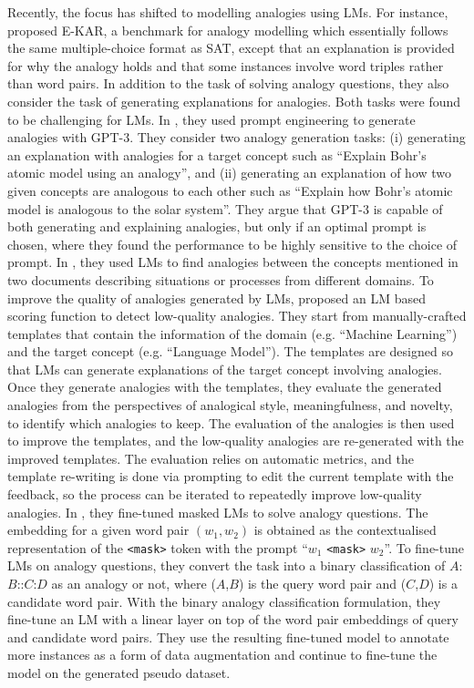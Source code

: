 \documentclass[3p]{elsarticle}
\begin{document}
{Recently, the focus has shifted to modelling analogies using LMs. For instance, \cite{chen-etal-2022-e} proposed E-KAR, a benchmark for analogy modelling which essentially follows the same multiple-choice format as SAT, except that an explanation is provided for why the analogy holds and that some instances involve word triples rather than word pairs. In addition to the task of solving analogy questions, they also consider the task of generating explanations for analogies. Both tasks were found to be challenging for LMs. 
In \cite{bhavya-etal-2022-analogy}, they used prompt engineering to generate analogies with GPT-3. They consider two analogy generation tasks: (i) generating an explanation with analogies for a target concept such as ``Explain Bohr's atomic model using an analogy'', and (ii) generating an explanation of how two given concepts are analogous to each other such as ``Explain how Bohr's atomic model is analogous to the solar system''. They argue that GPT-3 is capable of both generating and explaining analogies, but only if an optimal prompt is chosen, where they found the performance to be highly sensitive to the choice of prompt.
In \cite{sultan-shahaf-2022-life}, they used LMs to find analogies between the concepts mentioned in two documents describing situations or processes from different domains. 
To improve the quality of analogies generated by LMs, \cite{DBLP:conf/www/BhavyaXZ23} proposed an LM based scoring function to detect low-quality analogies. They start from manually-crafted templates that contain the information of the domain (e.g. ``Machine Learning'') and the target concept (e.g. ``Language Model''). The templates are designed so that LMs can generate explanations of the target concept involving analogies. Once they generate analogies with the templates, they evaluate the generated analogies from the perspectives of analogical style, meaningfulness, and novelty, to identify which analogies to keep. The evaluation of the analogies is then used to improve the templates, and the low-quality analogies are re-generated with the improved templates. The evaluation relies on automatic metrics, and the template re-writing is done via prompting to edit the current template with the feedback, so the process can be iterated to repeatedly improve low-quality analogies.
In \cite{10.1145/3543873.3587333}, they fine-tuned masked LMs to solve analogy questions. 
The embedding for a given word pair $(w_1,w_2)$ is obtained as the contextualised representation of the \texttt{<mask>} token with the prompt ``$w_1$ \texttt{<mask>} $w_2$''. To fine-tune LMs on analogy questions, they convert the task into a binary classification of $A$:$B$::$C$:$D$ as an analogy or not, where ($A$,$B$) is the query word pair and ($C$,$D$) is a candidate word pair. With the binary analogy classification formulation, they fine-tune an LM with a linear layer on top of the word pair embeddings of query and candidate word pairs. They use the resulting fine-tuned model to annotate more instances as a form of data augmentation and continue to fine-tune the model on the generated pseudo dataset. 


}
\end{document}
